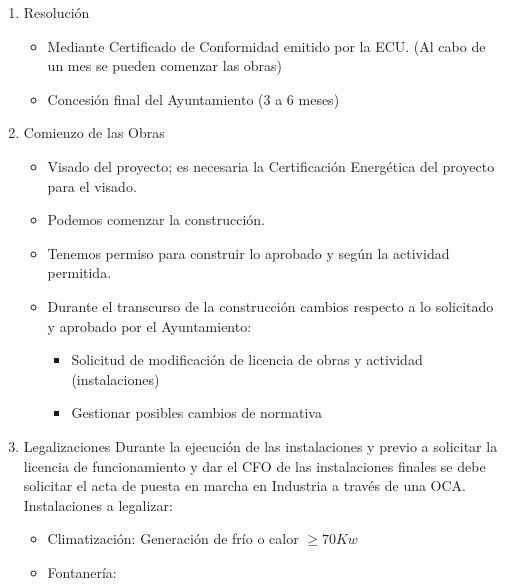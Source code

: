 \begin{enumerate}
    \begin{itemize}
        \item Informe preceptivo (Edificios BIC en Madrid a través de la Comisión Institucional Patrimonio Histórico, Artístico y Natutal (CIPHAN), DB-SI de Protección Civil,movilidad y medio ambiente)
        \item Subsanación de requerimientos (Posible desestimación de Licencia si no se subsanan las deficiencias).
    \end{itemize}
    \item Resolución
    \begin{itemize}
        \item Mediante Certificado de Conformidad emitido por la ECU. (Al cabo de un mes se pueden comenzar las obras)
        \item Concesión final del Ayuntamiento (3 a 6 meses)
    \end{itemize}
    \item Comienzo de las Obras
    \begin{itemize}
        \item Visado del proyecto; es necesaria la Certificación Energética del proyecto para el visado.
        \item Podemos comenzar la construcción.
        \item Tenemos permiso para construir lo aprobado y según la actividad permitida.
        \item Durante el transcurso de la construcción cambios respecto a lo solicitado y aprobado por el Ayuntamiento:
        \begin{itemize}
            \item Solicitud de modificación de licencia de obras y actividad (instalaciones)
            \item Gestionar posibles cambios de normativa
        \end{itemize}
    \end{itemize}
    \item Legalizaciones
    Durante la ejecución de las instalaciones y previo a solicitar la licencia de funcionamiento y dar el CFO de las instalaciones finales se debe solicitar el acta de puesta en marcha en Industria a través de una OCA.
    Instalaciones a legalizar:
    \begin{itemize}
        \item Climatización: Generación de frío o calor $\geq 70 Kw$
        \item Fontanería:
        \begin{itemize}

\end{itemize}
\end{itemize}
\end{enumerate}
